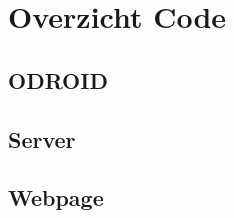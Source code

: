 \section{Overzicht Code}
\subsection{ODROID}\label{ODROID}
\scriptsize

\normalsize
\subsection{Server}
\subsection{Webpage}